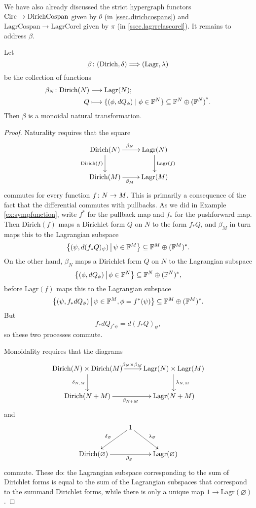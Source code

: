We have also already discussed the strict hypergraph functors $\mathrm{Circ} \to
\mathrm{DirichCospan}$ given by $\theta$ (in
\textsection\ref{ssec.dirichcospans}) and $\mathrm{LagrCospan} \to
\mathrm{LagrCorel}$ given by $\pi$ (in \textsection\ref{ssec.lagrrelascorel}).
It remains to address $\beta$.

\begin{proposition}
Let
\[
  \beta{\colon} (\mathrm{Dirich},\delta) \Longrightarrow (\mathrm{Lagr},\lambda)
\]
be the collection of functions
\begin{align*}
  \beta_N{\colon} \mathrm{Dirich}(N) &\longrightarrow \mathrm{Lagr}(N); \\
  Q &\longmapsto \{(\phi,dQ_\phi) \mid \phi \in {\mathbb F}^N\} \subseteq {{\mathbb F}^{N} \oplus {({\mathbb F}^{N})}^\ast}.
\end{align*}
Then $\beta$ is a monoidal natural transformation.
\end{proposition}

\begin{proof}
Naturality requires that the square
\[
\xymatrix{
  \mathrm{Dirich}(N) \ar[r]^{\beta_N} \ar[d]_{\mathrm{Dirich}(f)} &
  \mathrm{Lagr}(N) \ar[d]^{\mathrm{Lagr}(f)}  \\
  \mathrm{Dirich}(M) \ar[r]_{\beta_M} & \mathrm{Lagr}(M)
}
\]
commutes for every function $f{\colon} N \to M$. This is primarily a consequence of the
fact that the differential commutes with pullbacks. As we did in Example
\ref{ex:sympfunction},
write $f^\ast$ for the pullback map and $f_\ast$ for the pushforward map.
Then $\mathrm{Dirich}(f)$ maps a Dirichlet form $Q$ on $N$ to the form $f_\ast Q$,
and $\beta_M$ in turn maps this to the Lagrangian subspace 
\[
  \big\{(\psi,d(f_\ast Q)_\psi) \, \big\vert \, \psi \in {\mathbb F}^M\big\} \subseteq
  {\mathbb F}^M \oplus ({\mathbb F}^M)^\ast.
\]
On the other hand, $\beta_N$ maps a Dirichlet form $Q$ on $N$ to the Lagrangian
subspace
\[
\big\{(\phi,dQ_\phi) \,\big\vert\, \phi \in {\mathbb F}^N\big\}\subseteq
  {\mathbb F}^N \oplus ({\mathbb F}^N)^\ast, 
\]
before $\mathrm{Lagr}(f)$ maps this to the Lagrangian subspace
\[
  \big\{(\psi, f_\ast dQ_\phi) \,\big\vert\, \psi \in {\mathbb F}^M, \phi =
  f^\ast(\psi)\big\} \subseteq {\mathbb F}^M\oplus ({\mathbb F}^M)^\ast.
\]
But 
\[
  f_\ast dQ_{f^\ast\psi} = d(f_\ast Q)_{\psi},
\]
so these two processes commute.

Monoidality requires that the diagrams 
\[
\xymatrix{
  \mathrm{Dirich}(N) \times \mathrm{Dirich}(M) \ar[r]^(.52){\beta_N \times
  \beta_M} \ar[d]_{\delta_{N,M}} & \mathrm{Lagr}(N) \times \mathrm{Lagr}(M)
  \ar[d]^{\lambda_{N,M}}  \\
  \mathrm{Dirich}(N+M) \ar[r]_{\beta_{N+M}} & \mathrm{Lagr}(N+M)
}
\]
and
\[
  \xymatrix{
  & 1 \ar[dl]_{\delta_\varnothing} \ar[dr]^{\lambda_\varnothing}\\
\mathrm{Dirich}(\varnothing)  \ar[rr]_{\beta_\varnothing} &&
\mathrm{Lagr}(\varnothing)
}
\]
commute. These do: the Lagrangian subspace corresponding to the sum of Dirichlet
forms is equal to the sum of the Lagrangian subspaces that correspond to the
summand Dirichlet forms, while there is only a unique map $1 \to
\mathrm{Lagr}(\varnothing)$.
\end{proof}

